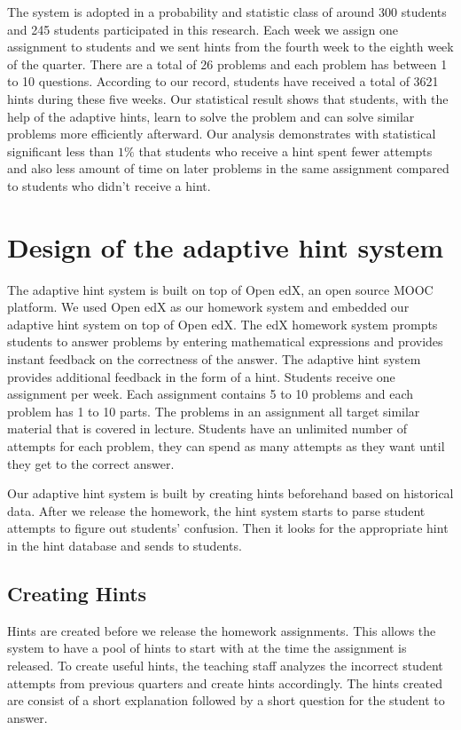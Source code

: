 \documentclass{sigchi/sigchi}
\begin{document}
The system is adopted in a probability and statistic class of around 300 students and 245 students participated in this research. Each week we assign one assignment to students and we sent hints from the fourth week to the eighth week of the quarter. There are a total of 26 problems and each problem has between 1 to 10 questions. According to our record, students have received a total of 3621 hints during these five weeks. Our statistical result shows that students, with the help of the adaptive hints, learn to solve the problem and can solve similar problems more efficiently afterward. Our analysis demonstrates with statistical significant less than $1\%$ that students who receive a hint spent fewer attempts and also less amount of time on later problems in the same assignment compared to students who didn't receive a hint.


\section*{Design of the adaptive hint system}
The adaptive hint system is built on top of Open edX, an open source MOOC platform. We used Open edX as our homework system and embedded our adaptive hint system on top of Open edX. The edX homework system prompts students to answer problems by entering mathematical expressions and provides instant feedback on the correctness of the answer. The adaptive hint system provides additional feedback in the form of a hint. Students receive one assignment per week. Each assignment contains 5 to 10 problems and each problem has 1 to 10 parts. The problems in an assignment all target similar material that is covered in lecture. Students have an unlimited number of attempts for each problem, they can spend as many attempts as they want until they get to the correct answer.

Our adaptive hint system is built by creating hints beforehand based on historical data. After we release the homework, the hint system starts to parse student attempts to figure out students' confusion. Then it looks for the appropriate hint in the hint database and sends to students.


\subsection*{Creating Hints}

Hints are created before we release the homework assignments. This allows the system to have a pool of hints to start with at the time the assignment is released. To create useful hints, the teaching staff analyzes the incorrect student attempts from previous quarters and create hints accordingly. The hints created are consist of a short explanation followed by a short question for the student to answer.
\end{document}
